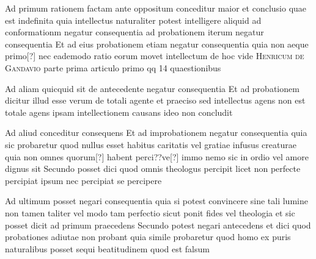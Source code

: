 \documentclass[twoside, openright]{article}
\newcommand{\name}[1]{\textsc{#1}}
\begin{document}
        \pstart
        Ad primum rationem factam ante oppositum conceditur maior et conclusio quae est indefinita quia intellectus naturaliter potest intelligere aliquid ad conformationm negatur consequentia ad probationem iterum negatur consequentia Et ad eius probationem etiam negatur consequentia quia non aeque primo[?] nec eademodo ratio eorum movet intellectum de hoc vide \name{Henricum de Gandavio} parte prima articulo primo qq 14 quaestionibus
        \pend
     
        \pstart
        Ad aliam quicquid sit de antecedente negatur consequentia Et ad probationem dicitur illud esse verum de totali agente et praeciso sed intellectus agens non est totale agens ipsam intellectionem causans ideo non concludit 
        \pend
     
        \pstart
        Ad aliud conceditur consequens Et ad improbationem negatur consequentia quia sic probaretur quod nullus esset habitus caritatis vel gratiae infusus creaturae quia non omnes quorum[?] habent perci??ve[?] immo nemo sic in ordio vel amore dignus sit Secundo posset dici quod omnis theologus percipit licet non perfecte percipiat ipsum nec percipiat se percipere
        \pend
     
        \pstart
        Ad ultimum posset negari consequentia quia si potest convincere sine tali lumine non tamen taliter vel modo tam perfectio sicut ponit fides vel theologia et sic posset dicit ad primum praecedens Secundo potest negari antecedens et dici quod probationes adiutae non probant quia simile probaretur quod homo ex puris naturalibus posset sequi beatitudinem quod est falsum 
        \pend
     
        \endnumbering
        
     
        
\end{document}
